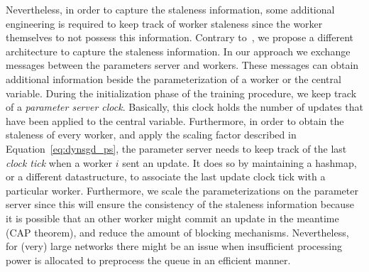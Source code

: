Nevertheless, in order to capture the staleness information, some additional engineering is required to keep track of worker staleness since the worker themselves to not possess this information. Contrary to~\cite{jiang2017heterogeneity}, we propose a different architecture to capture the staleness information. In our approach we exchange messages between the parameters server and workers. These messages can obtain additional information beside the parameterization of a worker or the central variable. During the initialization phase of the training procedure, we keep track of a \emph{parameter server clock}. Basically, this clock holds the number of updates that have been applied to the central variable. Furthermore, in order to obtain the staleness of every worker, and apply the scaling factor described in Equation~\ref{eq:dynsgd_ps}, the parameter server needs to keep track of the last \emph{clock tick} when a worker $i$ sent an update. It does so by maintaining a hashmap, or a different datastructure, to associate the last update clock tick with a particular worker. Furthermore, we scale the parameterizations on the parameter server since this will ensure the consistency of the staleness information because it is possible that an other worker might commit an update in the meantime (CAP theorem), and reduce the amount of blocking mechanisms. Nevertheless, for (very) large networks there might be an issue when insufficient processing power is allocated to preprocess the queue in an efficient manner.\\

